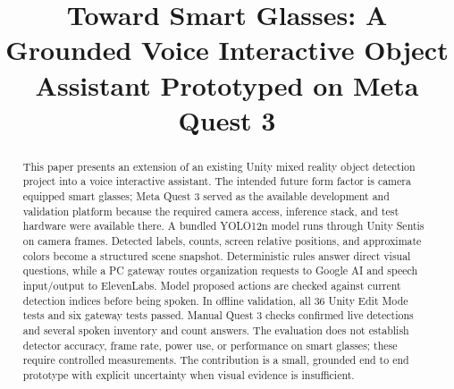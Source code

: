\documentclass[conference]{IEEEtran}
\begin{document}
\title{Toward Smart Glasses: A Grounded Voice Interactive Object Assistant Prototyped on Meta Quest 3}
\author{
\and
{}
\and
{}
\and
{}
\and
{}
}
\maketitle

\begin{abstract}
This paper presents an extension of an existing Unity mixed reality object detection project into a voice interactive assistant. The intended future form factor is camera equipped smart glasses; Meta Quest 3 served as the available development and validation platform because the required camera access, inference stack, and test hardware were available there. A bundled YOLO12n model runs through Unity Sentis on camera frames. Detected labels, counts, screen relative positions, and approximate colors become a structured scene snapshot. Deterministic rules answer direct visual questions, while a PC gateway routes organization requests to Google AI and speech input/output to ElevenLabs. Model proposed actions are checked against current detection indices before being spoken. In offline validation, all 36 Unity Edit Mode tests and six gateway tests passed. Manual Quest 3 checks confirmed live detections and several spoken inventory and count answers. The evaluation does not establish detector accuracy, frame rate, power use, or performance on smart glasses; these require controlled measurements. The contribution is a small, grounded end to end prototype with explicit uncertainty when visual evidence is insufficient.
\end{abstract}
\end{document}
